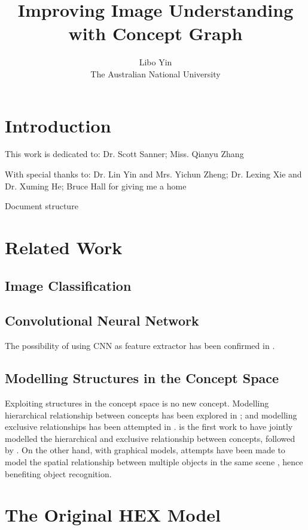 \documentclass[11pt,a4paper]{book}
\begin{document}
\title{Improving Image Understanding with Concept Graph}
\author{Libo Yin\\The Australian National University}
\maketitle

\chapter{Introduction}

This work is dedicated to: Dr. Scott Sanner; Miss. Qianyu Zhang

With special thanks to: Dr. Lin Yin and Mrs. Yichun Zheng; Dr. Lexing Xie and Dr. Xuming He; Bruce Hall for giving me a home

Document structure

\chapter{Related Work}
\section{Image Classification}
\section{Convolutional Neural Network}

The possibility of using CNN as feature extractor has been confirmed in \cite{razavian2014cnn}.

\section{Modelling Structures in the Concept Space}

Exploiting structures in the concept space is no new concept. Modelling hierarchical relationship between concepts has been explored in \cite{marszalek2007semantic, ordonez2013large}; and modelling exclusive relationships has been attempted in \cite{chen2011multi}. \cite{deng2014large} is the first work to have jointly modelled the hierarchical and exclusive relationship between concepts, followed by \cite{ding2015probabilistic}. On the other hand, with graphical models, attempts have been made to model the spatial relationship between multiple objects in the same scene \cite{choi2012tree}, hence benefiting object recognition.

\chapter{The Original HEX Model}
\end{document}
